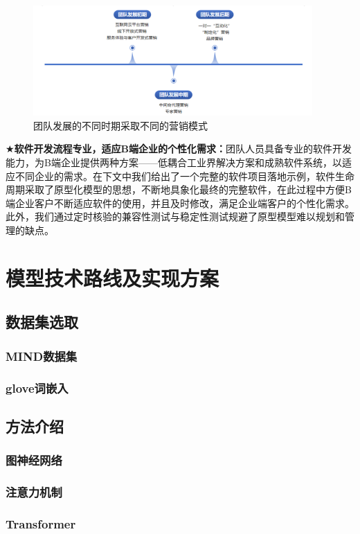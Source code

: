 \documentclass[withoutpreface,bwprint]{cumcmthesis} %
\begin{document}
	\begin{figure}[H]
		\includegraphics[width=0.95\textwidth]{营销发展}
		\caption{团队发展的不同时期采取不同的营销模式}
		\label{fig:circuit-diagcam}
	\end{figure}
	$\bigstar$\textbf{软件开发流程专业，适应B端企业的个性化需求：}团队人员具备专业的软件开发能力，为B端企业提供两种方案——低耦合工业界解决方案和成熟软件系统，以适应不同企业的需求。在下文中我们给出了一个完整的软件项目落地示例，软件生命周期采取了原型化模型的思想，不断地具象化最终的完整软件，在此过程中方便B端企业客户不断适应软件的使用，并且及时修改，满足企业端客户的个性化需求。此外，我们通过定时核验的兼容性测试与稳定性测试规避了原型模型难以规划和管理的缺点。\par
	\newpage
	\section{模型技术路线及实现方案}
	\subsection{数据集选取}
	\subsubsection{ MIND数据集}
	\subsubsection{ glove词嵌入}
	\subsection{方法介绍}
	\subsubsection{ 图神经网络}
	\subsubsection{ 注意力机制}
	\subsubsection{ Transformer}
\end{document}
